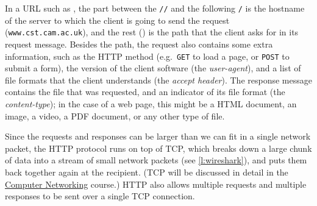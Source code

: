 In a URL such as \courseurl, the part between the \verb|//| and the following \verb|/| is the hostname of the server to which the client is going to send the request (\texttt{www.cst.cam.ac.uk}), and the rest (\texttt{\coursepath}) is the path that the client asks for in its request message.
Besides the path, the request also contains some extra information, such as the HTTP method (e.g.\ \texttt{GET} to load a page, or \texttt{POST} to submit a form), the version of the client software (the \emph{user-agent}), and a list of file formats that the client understands (the \emph{accept header}).
The response message contains the file that was requested, and an indicator of its file format (the \emph{content-type}); in the case of a web page, this might be a HTML document, an image, a video, a PDF document, or any other type of file.

\begin{frame}[plain]
    \label{s:http-capture}
\end{frame}
\label{l:http-capture}

Since the requests and responses can be larger than we can fit in a single network packet, the HTTP protocol runs on top of TCP, which breaks down a large chunk of data into a stream of small network packets (see \autoref{l:wireshark}), and puts them back together again at the recipient.
(TCP will be discussed in detail in the \href{\networking}{Computer Networking} course.)
HTTP also allows multiple requests and multiple responses to be sent over a single TCP connection.

